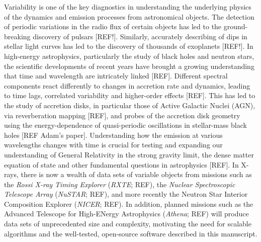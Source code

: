\documentclass[twocolumn]{aastex62}
\newcommand{\project}[1]{\textsl{#1}\xspace}
\newcommand{\rxte}{\project{RXTE}\xspace}
\newcommand{\nustar}{\project{NuSTAR}\xspace}
\begin{document}
Variability is one of the key diagnostics in understanding the underlying physics of the dynamics and emission processes from astronomical objects. 
The detection of periodic variations in the radio flux of certain objects has led to the ground-breaking discovery of pulsars [REF!]. Similarly, accurately describing of dips in stellar light curves has led to the discovery of thousands of exoplanets [REF!]. 
In high-energy astrophysics, particularly the study of black holes and neutron stars, the scientific developments of recent years have brought a growing understanding that time and wavelength are intricately linked [REF]. 
Different spectral components react differently to changes in accretion rate and dynamics, leading to time lags, correlated variability and higher-order effects [REF]. 
This has led to the study of accretion disks, in particular those of Active Galactic Nuclei (AGN), via reverberation mapping [REF], and probes of the accretion disk geometry using the energy-dependence of quasi-periodic oscillations in stellar-mass black holes [REF Adam's paper]. 
Understanding how the emission at various wavelengths changes with time is crucial for testing and expanding our understanding of General Relativity in the strong gravity limit, the dense matter equation of state and other fundamental questions in astrophysics [REF].
In X-rays, there is now a wealth of data sets of variable objects from missions such as the \textit{Rossi X-ray Timing Explorer} (\rxte; REF), the \textit{Nuclear Spectroscopic Telescope Array} (\nustar; REF), and more recently the Neutron Star Interior Composition Explorer (\textit{NICER}; REF). In addition, planned missions such as the Advanced Telescope for High-ENergy Astrophysics (\textit{Athena}; REF) will produce data sets of unprecedented size and complexity, motivating the need for scalable algorithms and the well-tested, open-source software described in this manuscript.
\end{document}
